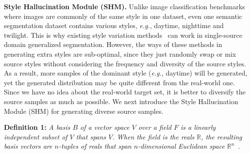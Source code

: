 \documentclass[runningheads]{llncs}
\def\eg{\emph{e.g.}} \def\Eg{\emph{E.g.}}
\begin{document}
\noindent\textbf{Style Hallucination Module (SHM).}
Unlike image classification benchmarks where images are commonly of the same style in one dataset, even one semantic segmentation dataset contains various styles, \eg, daytime, nighttime and twilight.
This is why existing style variation methods~\cite{crossnorm,zhou2021mixstyle} can work in single-source domain generalized segmentation.
However, the ways of these methods in generating extra styles are sub-optimal, since they just randomly swap or mix source styles without considering the frequency and diversity of the source styles. As a result, more samples of the dominant style (\eg, daytime) will be generated, yet the generated distribution may be quite different from the real-world one. 
Since we have no idea about the real-world target set, it is better to diversify the source samples as much as possible. We next introduce the Style Hallucination Module (SHM) for generating diverse source samples.


\noindent\textbf{Definition 1:} 
\textit{A basis $B$ of a vector space $V$ over a field $F$ is a linearly independent subset of $V$ that spans $V$. When the field is the reals $\mathbb{R}$, the resulting basis vectors are $n$-tuples of reals that span $n$-dimensional Euclidean space $\mathbb{R}^n$}~\cite{basis}.
\end{document}
